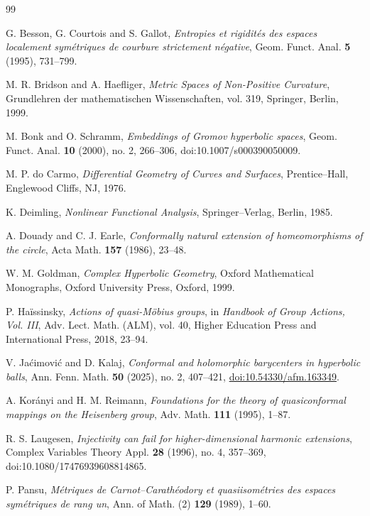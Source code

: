 \documentclass[11pt]{article}
\theoremstyle{definition}
\theoremstyle{remark}
\theoremstyle{definition}
\begin{document}
\begin{thebibliography}{99}

G. Besson, G. Courtois and S. Gallot,
\emph{Entropies et rigidit\'es des espaces localement sym\'etriques de courbure strictement n\'egative},
Geom. Funct. Anal. \textbf{5} (1995), 731--799.

M. R. Bridson and A. Haefliger,
\emph{Metric Spaces of Non-Positive Curvature},
Grundlehren der mathematischen Wissenschaften, vol. 319,
Springer, Berlin, 1999.

M. Bonk and O. Schramm,
\emph{Embeddings of Gromov hyperbolic spaces},
Geom. Funct. Anal. \textbf{10} (2000), no. 2, 266--306,
doi:10.1007/s000390050009.

M. P. do Carmo,
\emph{Differential Geometry of Curves and Surfaces},
Prentice--Hall, Englewood Cliffs, NJ, 1976.

K. Deimling,
\emph{Nonlinear Functional Analysis},
Springer--Verlag, Berlin, 1985.

A. Douady and C. J. Earle,
\emph{Conformally natural extension of homeomorphisms of the circle},
Acta Math. \textbf{157} (1986), 23--48.

W. M. Goldman,
\emph{Complex Hyperbolic Geometry},
Oxford Mathematical Monographs,
Oxford University Press, Oxford, 1999.

P. Ha\"issinsky,
\emph{Actions of quasi-M\"obius groups},
in \emph{Handbook of Group Actions, Vol. III},
Adv. Lect. Math. (ALM), vol. 40,
Higher Education Press and International Press,
2018, 23--94.

V. Ja\'cimovi\'c and D. Kalaj,
\emph{Conformal and holomorphic barycenters in hyperbolic balls},
Ann. Fenn. Math. \textbf{50} (2025), no. 2, 407--421,
\href{https://doi.org/10.54330/afm.163349}
{doi:10.54330/afm.163349}.

A. Kor\'anyi and H. M. Reimann,
\emph{Foundations for the theory of quasiconformal mappings on the Heisenberg group},
Adv. Math. \textbf{111} (1995), 1--87.

R. S. Laugesen,
\emph{Injectivity can fail for higher-dimensional harmonic extensions},
Complex Variables Theory Appl. \textbf{28} (1996), no. 4, 357--369,
doi:10.1080/17476939608814865.

P. Pansu,
\emph{M\'etriques de Carnot--Carath\'eodory et quasiisom\'etries des espaces sym\'etriques de rang un},
Ann. of Math. (2) \textbf{129} (1989), 1--60.


\end{thebibliography}
\end{document}
